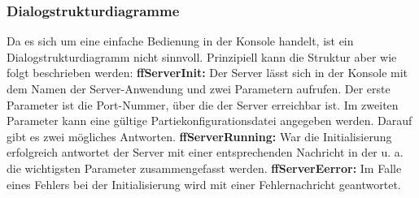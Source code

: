 \subsubsection{Dialogstrukturdiagramme}  
Da es sich um eine einfache Bedienung in der Konsole handelt, ist ein Dialogstrukturdiagramm nicht sinnvoll. Prinzipiell kann die Struktur aber wie folgt beschrieben werden: \textbf{ffServerInit:} Der Server lässt sich in der Konsole mit dem Namen der Server-Anwendung und zwei Parametern aufrufen. Der erste Parameter ist die Port-Nummer, über die der Server erreichbar ist. Im zweiten Parameter kann eine gültige Partiekonfigurationsdatei angegeben werden. Darauf gibt es zwei mögliches Antworten. \textbf{ffServerRunning:} War die Initialisierung erfolgreich antwortet der Server mit einer entsprechenden Nachricht in der u. a. die wichtigsten Parameter zusammengefasst werden. \textbf{ffServerEerror:} Im Falle eines Fehlers bei der Initialisierung wird mit einer Fehlernachricht geantwortet.



